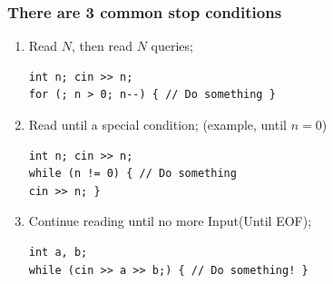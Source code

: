 \begin{frame}[fragile]
  \frametitle{There are 3 common stop conditions}

  \begin{enumerate}
  \item Read $N$, then read $N$ queries;
\begin{verbatim}
int n; cin >> n;
for (; n > 0; n--) { // Do something }
\end{verbatim}
\item Read until a special condition; (example, until $n = 0$)
\begin{verbatim}
int n; cin >> n;
while (n != 0) { // Do something
cin >> n; }
\end{verbatim}
  \item Continue reading until no more Input\hfil (Until EOF);
\begin{verbatim}
int a, b;
while (cin >> a >> b;) { // Do something! }
\end{verbatim}
  \end{enumerate}
\end{frame}

